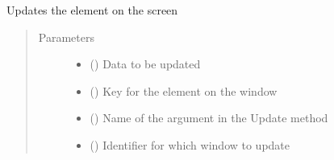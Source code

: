 \documentclass[letterpaper,10pt,english]{sphinxmanual}
\begin{document}
\begin{fulllineitems}

\begin{fulllineitems}
\label{\detokenize{interface:interface.Interface.update_element}}
\sphinxAtStartPar
Updates the element on the screen
\begin{quote}\begin{description}
\item[{Parameters}] \leavevmode\begin{itemize}
\item {} 
\sphinxAtStartPar
{} () \textendash{} Data to be updated

\item {} 
\sphinxAtStartPar
{} () \textendash{} Key for the element on the window

\item {} 
\sphinxAtStartPar
{} (\sphinxstyleliteralemphasis{\sphinxupquote{, }}) \textendash{} Name of the argument in the Update method

\item {} 
\sphinxAtStartPar
{} (\sphinxstyleliteralemphasis{\sphinxupquote{, }}) \textendash{} Identifier for which window to update

\end{itemize}

\end{description}\end{quote}

\end{fulllineitems}



\end{fulllineitems}
\end{document}
